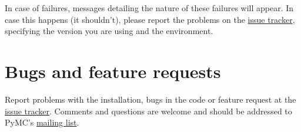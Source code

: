 In case of failures, messages detailing the nature of these failures will 
appear. In case this happens (it shouldn't), please report
the problems on the \href{http://code.google.com/p/pymc/issues/list.}{issue tracker}, specifying the version you are using and 
the environment.



\hypertarget{bugs-and-feature-requests}{}
\section*{Bugs and feature requests}

Report problems with the installation, bugs in the code or feature request at 
the \href{http://code.google.com/p/pymc/issues/list.}{issue tracker}. Comments and questions are welcome and should be 
addressed to PyMC's \href{mailto:pymc-users@fisher.forestry.uga.edu}{mailing list}.

